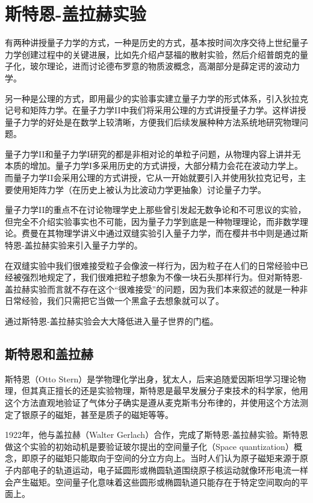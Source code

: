 \section{斯特恩-盖拉赫实验}

有两种讲授量子力学的方式，一种是历史的方式，基本按时间次序交待上世纪量子力学创建过程中的关键进展，比如先介绍卢瑟福的散射实验，然后介绍普朗克的量子化，玻尔理论，进而讨论德布罗意的物质波概念，高潮部分是薛定谔的波动力学。

另一种是公理的方式，即用最少的实验事实建立量子力学的形式体系，引入狄拉克记号和矩阵力学。在量子力学II中我们将采用公理的方式讲授量子力学。这样讲授量子力学的好处是在数学上较清晰，方便我们后续发展种种方法系统地研究物理问题。

量子力学II和量子力学I研究的都是非相对论的单粒子问题，从物理内容上讲并无本质的增加。量子力学I多采用历史的方式讲授，大部分精力会花在波动力学上。而量子力学II会采用公理的方式讲授，它从一开始就要引入并使用狄拉克记号，主要使用矩阵力学（在历史上被认为比波动力学更抽象）讨论量子力学。

量子力学II的重点不在讨论物理学史上那些曾引发起无数争论和不可思议的实验，但完全不介绍实验事实也不可能，因为量子力学到底是一种物理理论，而非数学理论。费曼在其物理学讲义中通过双缝实验引入量子力学，而在樱井书中则是通过斯特恩-盖拉赫实验来引入量子力学的。

在双缝实验中我们很难接受粒子会像波一样行为，因为粒子在人们的日常经验中已经被强烈地规定了，我们很难把粒子想象为不像一块石头那样行为。但对斯特恩-盖拉赫实验而言就不存在这个“很难接受”的问题，因为我们本来叙述的就是一种非日常经验，我们只需把它当做一个黑盒子去想象就可以了。

通过斯特恩-盖拉赫实验会大大降低进入量子世界的门槛。

\subsection{斯特恩和盖拉赫}

斯特恩（Otto Stern）是学物理化学出身，犹太人，后来追随爱因斯坦学习理论物理，但其真正擅长的还是实验物理，斯特恩是最早发展分子束技术的科学家，他用这个方法直观地验证了气体分子确实是遵从麦克斯韦分布律的，并使用这个方法测定了银原子的磁矩，甚至是质子的磁矩等等。

1922年，他与盖拉赫（Walter Gerlach）合作，完成了斯特恩-盖拉赫实验。斯特恩做这个实验的初始动机是要验证玻尔提出的空间量子化（Space quantization）概念，即原子的磁矩只能取向于空间的分立方向上。当时人们认为原子磁矩来源于原子内部电子的轨道运动，电子延圆形或椭圆轨道围绕原子核运动就像环形电流一样会产生磁矩。空间量子化意味着这些圆形或椭圆轨道只能存在于特定空间取向的平面上。

